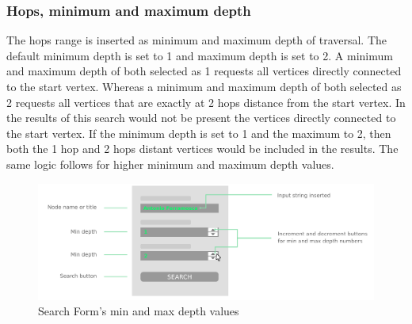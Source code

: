 \subsubsection{Hops, minimum and maximum depth}\label{subsubsection:ImplementingtheWebApp/Thefrontend/SearchFormcomponent/Hopsminimumandmaximumdepth}
The hops range is inserted as minimum and maximum depth of traversal.
The default minimum depth is set to 1 and maximum depth is set to 2.
A minimum and maximum depth of both selected as 1 requests all vertices directly connected to the start vertex.
Whereas a minimum and maximum depth of both selected as 2 requests all vertices that are exactly at 2 hops distance from the start vertex.
In the results of this search would not be present the vertices directly connected to the start vertex.
If the minimum depth is set to 1 and the maximum to 2, then both the 1 hop and 2 hops distant vertices would be included in the results.
The same logic follows for higher minimum and maximum depth values.

\begin{figure}[H]%
	\centering%
	\includegraphics[width=1\textwidth]{images/chapter4/frontendsearchminmaxdepth.pdf}%
	\caption[Search Form's min and max depth values]{Search Form's min and max depth values}%
	\label{fig:frontendsearchminmaxdepth}
\end{figure}%

\medskip

